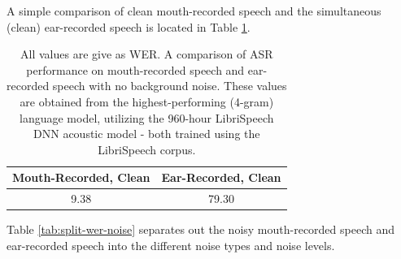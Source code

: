 A simple comparison of clean mouth-recorded speech and the simultaneous (clean) ear-recorded speech is located in Table \ref{tab:clean-wers}.

\begin{table}[h]
\begin{center}
\begin{tabular}{| c | c |} \hline
 Mouth-Recorded, Clean & Ear-Recorded, Clean \\ \hline\hline
 9.38 & 79.30 \\ \hline
\end{tabular}
\end{center}
\caption{All values are give as WER.  A comparison of ASR performance on mouth-recorded speech and ear-recorded speech with no background noise. These values are obtained from the highest-performing (4-gram) language model, utilizing the 960-hour LibriSpeech DNN acoustic model - both trained using the LibriSpeech corpus.}\label{tab:clean-wers}
\end{table}

Table \ref{tab:split-wer-noise} separates out the noisy mouth-recorded speech and ear-recorded speech into the different noise types and noise levels.

